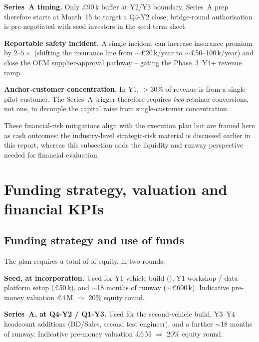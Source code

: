 \begin{tightitemize}
  \item \textbf{Series~A timing.} Only \pounds90\,k buffer at
        Y2/Y3 boundary. Series~A prep therefore starts at Month~15
        to target a Q4-Y2 close; bridge-round authorisation is
        pre-negotiated with seed investors in the seed term sheet.
  \item \textbf{Reportable safety incident.} A single incident can
        increase insurance premium by $2$--$5\times$ (shifting the
        insurance line from $\sim$\pounds20\,k/year to
        $\sim$\pounds50--100\,k/year) and close the OEM
        supplier-approval pathway -- gating the
        Phase~3~Y4+ revenue ramp.
  \item \textbf{Anchor-customer concentration.} In Y1,
        $>$30\% of revenue is from a single pilot customer. The
        Series~A trigger therefore requires \emph{two} retainer
        conversions, not one, to decouple the capital raise from
        single-customer concentration.
\end{tightitemize}

These financial-risk mitigations align with the execution plan but are
framed here as cash outcomes: the industry-level strategic-risk material is
discussed earlier in this report, whereas this subsection adds the
liquidity and runway perspective needed for financial evaluation.

\section{Funding strategy, valuation and financial KPIs}
\label{ch:funding}

\subsection{Funding strategy and use of funds}
\label{sec:funding}

The plan requires a total of \totalRaise of equity, in two
rounds.

\begin{tightitemize}
  \item \textbf{Seed, \seedRound at incorporation.} Used for Y1
        vehicle build (\capexPerVehicle), Y1 workshop / data-platform
        setup (\pounds50\,k), and $\sim$18 months of runway
        ($\sim$\pounds600\,k). Indicative pre-money valuation
        \pounds4\,M $\Rightarrow$ 20\% equity round.
  \item \textbf{Series~A, \seriesARound at Q4-Y2 / Q1-Y3.} Used
        for the second-vehicle build, Y3--Y4 headcount additions
        (BD/Sales, second test engineer), and a further $\sim$18
        months of runway. Indicative pre-money valuation
        \pounds6\,M $\Rightarrow$ 20\% equity round.
\end{tightitemize}

